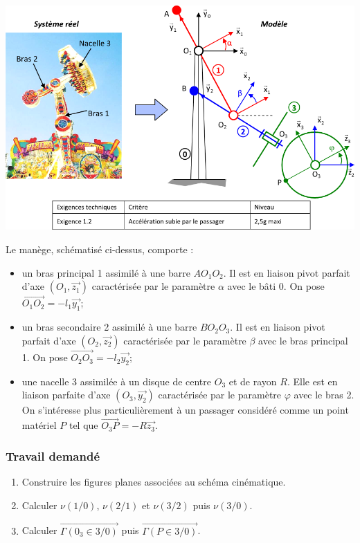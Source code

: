 \begin{center}
\includegraphics[width=.9\textwidth]{png/img1}
\end{center}

Le manège, schématisé ci-dessus, comporte :
\begin{itemize}
\item un bras principal 1 assimilé à une barre $AO_1O_2$. Il est en liaison pivot parfait d'axe $(O_1,\overrightarrow{z_1})$ caractérisée par le paramètre $\alpha$ avec le bâti 0. On pose $\overrightarrow{O_1O_2}=-l_1\overrightarrow{y_1}$;
\item un bras secondaire 2 assimilé à une barre $BO_2O_3$. Il est en liaison pivot parfait d'axe $(O_2,\overrightarrow{z_2})$ caractérisée par le paramètre $\beta$ avec le bras principal 1. On pose $\overrightarrow{O_2O_3}=-l_2\overrightarrow{y_2}$;
\item une nacelle 3 assimilée à un disque de centre $O_3$ et de rayon $R$. Elle est en liaison parfaite d'axe $(O_3,\overrightarrow{y_2})$ caractérisée par le paramètre $\varphi$ avec le bras 2. On s'intéresse plus particulièrement à un passager considéré comme un point matériel $P$ tel que $\overrightarrow{O_3P}=-R\overrightarrow{z_3}$.
\end{itemize}

\subsubsection{Travail demandé}
\begin{enumerate}
\item Construire les figures planes associées au schéma cinématique.
\item Calculer $\nu(1/0)$, $\nu(2/1)$ et $\nu(3/2)$ puis $\nu(3/0)$.
\item Calculer $\overrightarrow{\Gamma(0_3 \in 3/0)}$ puis $\overrightarrow{\Gamma(P \in 3/0)}$.
\end{enumerate}
\newpage

